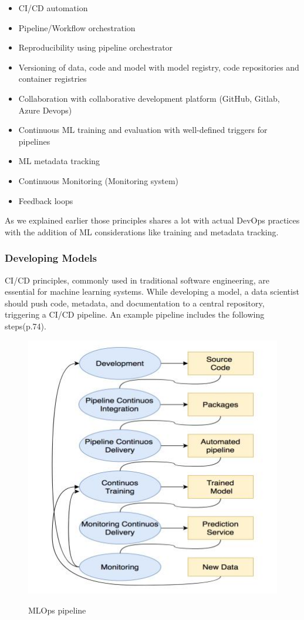 \begin{itemize}
    \item CI/CD automation
    \item Pipeline/Workflow orchestration
    \item Reproducibility using pipeline orchestrator
    \item Versioning of data, code and model with model registry, code repositories and container registries
    \item Collaboration with collaborative development platform (GitHub, Gitlab, Azure Devops)
    \item Continuous ML training and evaluation with well-defined triggers for pipelines
    \item ML metadata tracking
    \item Continuous Monitoring (Monitoring system)
    \item Feedback loops
\end{itemize}

As we explained earlier those principles shares a lot with actual DevOps practices with the addition of ML considerations
like training and metadata tracking.

\subsubsection{Developing Models}
CI/CD principles, commonly used in traditional software engineering, are essential for machine learning systems.
While developing a model, a data scientist should push code, metadata, and documentation to a central repository, triggering a CI/CD pipeline\cite{10855428}.
An example pipeline includes the following steps\cite{treveil2020introducing}(p.74).

\begin{figure}[!htbp]
    \caption{MLOps pipeline\cite{inproceedings}}
    \centering
    \includegraphics[scale=0.5]{images/mlops-pipeline}
    \label{fig:mlops-pipeline}
\end{figure}

